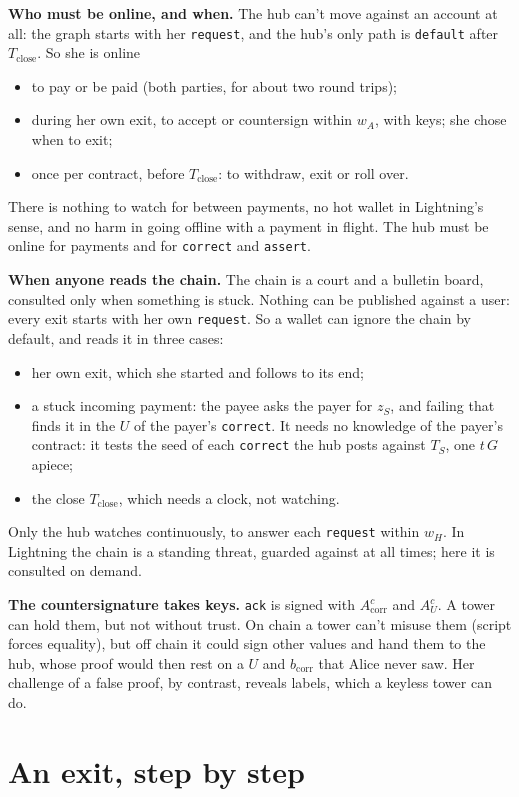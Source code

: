 \documentclass[11pt]{article}
\theoremstyle{plain}
\theoremstyle{definition}
\newcommand{\Tc}{T_{\mathrm{close}}}
\newcommand{\bcorr}{b_{\mathrm{corr}}}
\newcommand{\tx}[1]{\texttt{#1}}
\newcommand{\Acorr}{A_{\mathrm{corr}}^{c}}
\newcommand{\AU}{A_{U}^{c}}
\begin{document}
\textbf{Who must be online, and when.} The hub can't move against an
account at all: the graph starts with her \tx{request}, and the hub's
only path is \tx{default} after $\Tc$. So she is online
\begin{itemize}[nosep]
\item to pay or be paid (both parties, for about two round trips);
\item during her own exit, to accept or countersign within $w_A$, with
  keys; she chose when to exit;
\item once per contract, before $\Tc$: to withdraw, exit or roll over.
\end{itemize}
There is nothing to watch for between payments, no hot wallet in
Lightning's sense, and no harm in going offline with a payment in
flight. The hub must be online for payments and for \tx{correct} and
\tx{assert}.

\textbf{When anyone reads the chain.} The chain is a court and a
bulletin board, consulted only when something is stuck. Nothing can be
published against a user: every exit starts with her own \tx{request}.
So a wallet can ignore the chain by default, and reads it in three
cases:
\begin{itemize}[nosep]
\item her own exit, which she started and follows to its end;
\item a stuck incoming payment: the payee asks the payer for $z_S$, and
  failing that finds it in the $U$ of the payer's \tx{correct}. It
  needs no knowledge of the payer's contract: it tests the seed of each
  \tx{correct} the hub posts against $T_S$, one $t\,G$ apiece;
\item the close $\Tc$, which needs a clock, not watching.
\end{itemize}
Only the hub watches continuously, to answer each \tx{request} within
$w_H$. In Lightning the chain is a standing threat, guarded against at
all times; here it is consulted on demand.

\textbf{The countersignature takes keys.} \tx{ack} is signed with
$\Acorr$ and $\AU$. A tower can hold them, but not without trust. On
chain a tower can't misuse them (script forces equality), but off chain
it could sign other values and hand them to the hub, whose proof would
then rest on a $U$ and $\bcorr$ that Alice never saw. Her challenge of
a false proof, by contrast, reveals labels, which a keyless tower can
do.

\section{An exit, step by step}\label{sec:example}
\end{document}
